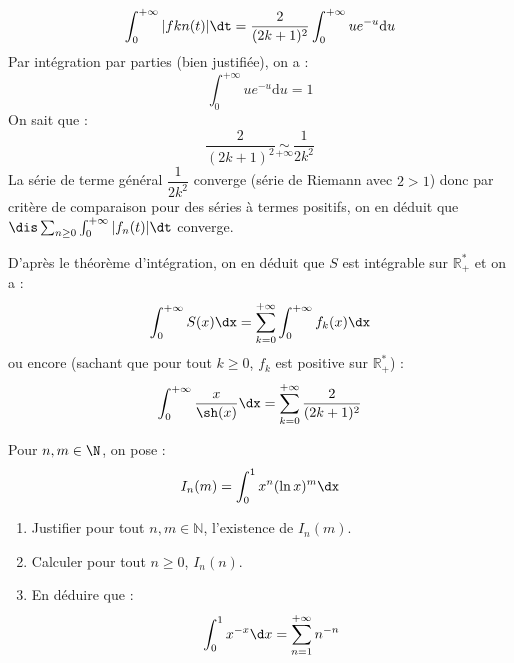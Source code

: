 \documentclass[a4paper,10pt]{report}
\begin{document}
\begin{enumerate}
\begin{itemize}
$$  \int_0^{+ \infty} \vert fkn(t) \vert \dt = \dfrac{2}{(2k+1)^2} \int_0^{+\infty} u e^{-u} \textrm{d}u$$
Par  intégration par parties (bien justifiée), on a :
$$ \int_0^{+\infty} u e^{-u} \textrm{d}u = 1$$
On sait que :
$$ \dfrac{2}{(2k+1)^2} \underset{+ \infty}{\sim} \dfrac{1}{2k^2}$$
La série de terme général $\dfrac{1}{2k^2}$ converge (série de Riemann avec $2>1$) donc par critère de comparaison pour des séries à termes positifs, on en déduit que $\dis \sum_{n \geq 0} \int_{0}^{+ \infty} \vert f_n(t) \vert \dt$ converge.
\end{itemize}
D'après le théorème d'intégration, on en déduit que $S$ est intégrable sur $\mathbb{R}_+^*$ et on a :
$$ \int_0^{+ \infty} S(x) \dx = \sum_{k=0}^{+ \infty} \int_0^{+ \infty} f_k(x) \dx$$
ou encore (sachant que pour tout $k \geq 0$, $f_k$ est positive sur $\mathbb{R}_+^*$) :
$$ \int_0^{+ \infty} \dfrac{x}{\sh(x)} \dx = \sum_{k=0}^{+ \infty} \dfrac{2}{(2k+1)^2}$$
\end{enumerate}


 
\begin{Exa} Pour $n,m \in \N$, on pose :
  \[
  I_{n}(m) = \int_{0}^{1} x^{n}(\ln x)^{m} \dx
  \]
  \begin{enumerate}
  \item Justifier pour tout $n,m \in \mathbb{N}$, l'existence de $I_n(m)$.
  \item Calculer pour tout $n \geq 0$, $I_{n}(n)$.
  \item
    En déduire que :
    \[
    \int_{0}^{1} x^{ - x} \d x = \sum_{n = 1}^{ + \infty} n^{ - n}
    \]
  \end{enumerate}
\end{Exa}

\corr 
\end{document}
